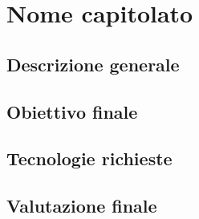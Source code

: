 \documentclass[main.tex]{subfiles}
\begin{document}
\chapter{Nome capitolato}
\section{Descrizione generale}
\section{Obiettivo finale}
\section{Tecnologie richieste}
\section{Valutazione finale}
\end{document}
